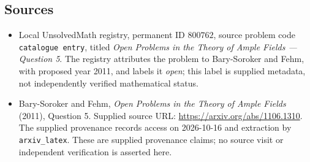 \documentclass[11pt]{article}
\begin{document}
\subsection{Sources}
\begin{itemize}
\item Local UnsolvedMath registry, permanent ID \(800762\), source problem code \texttt{catalogue entry}, titled \emph{Open Problems in the Theory of Ample Fields --- Question 5}. The registry attributes the problem to Bary-Soroker and Fehm, with proposed year 2011, and labels it \emph{open}; this label is supplied metadata, not independently verified mathematical status.
\item Bary-Soroker and Fehm, \emph{Open Problems in the Theory of Ample Fields} (2011), Question 5. Supplied source URL: \url{https://arxiv.org/abs/1106.1310}. The supplied provenance records access on 2026-10-16 and extraction by \texttt{arxiv\_latex}. These are supplied provenance claims; no source visit or independent verification is asserted here.
\end{itemize}
\end{document}
